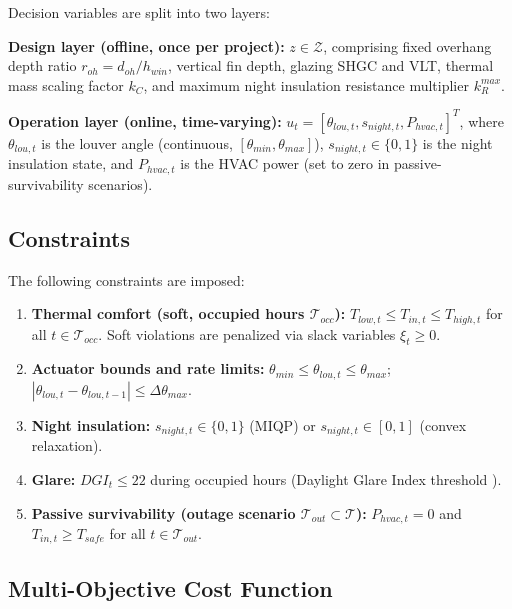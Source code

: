 \documentclass[5p,times,twocolumn]{elsarticle}
\begin{document}
Decision variables are split into two layers:

\textbf{Design layer (offline, once per project):} $z \in \mathcal{Z}$, comprising fixed overhang depth ratio $r_{oh} = d_{oh}/h_{win}$, vertical fin depth, glazing SHGC and VLT, thermal mass scaling factor $k_C$, and maximum night insulation resistance multiplier $k_R^{max}$.

\textbf{Operation layer (online, time-varying):} $u_t = [\theta_{lou,t}, s_{night,t}, P_{hvac,t}]^T$, where $\theta_{lou,t}$ is the louver angle (continuous, $[\theta_{min}, \theta_{max}]$), $s_{night,t} \in \{0,1\}$ is the night insulation state, and $P_{hvac,t}$ is the HVAC power (set to zero in passive-survivability scenarios).

\subsection{Constraints}
\label{sec:constraints}

The following constraints are imposed:

\begin{enumerate}
\item \textbf{Thermal comfort (soft, occupied hours $\mathcal{T}_{occ}$):} $T_{low,t} \leq T_{in,t} \leq T_{high,t}$ for all $t \in \mathcal{T}_{occ}$. Soft violations are penalized via slack variables $\xi_t \geq 0$.

\item \textbf{Actuator bounds and rate limits:} $\theta_{min} \leq \theta_{lou,t} \leq \theta_{max}$; $|\theta_{lou,t} - \theta_{lou,t-1}| \leq \Delta\theta_{max}$.

\item \textbf{Night insulation:} $s_{night,t} \in \{0,1\}$ (MIQP) or $s_{night,t} \in [0,1]$ (convex relaxation).

\item \textbf{Glare:} $DGI_t \leq 22$ during occupied hours (Daylight Glare Index threshold \cite{wienold2006}).

\item \textbf{Passive survivability (outage scenario $\mathcal{T}_{out} \subset \mathcal{T}$):} $P_{hvac,t} = 0$ and $T_{in,t} \geq T_{safe}$ for all $t \in \mathcal{T}_{out}$.
\end{enumerate}

\subsection{Multi-Objective Cost Function}
\end{document}
